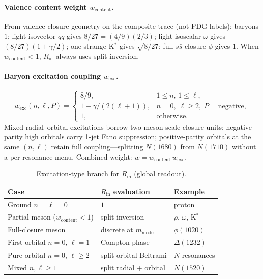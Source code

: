 \documentclass[11pt]{amsart}
\begin{document}
\paragraph{Valence content weight $w_{\mathrm{content}}$.}
From valence closure geometry on the composite trace (not PDG labels):
baryons $1$; light isovector $q\bar q$ gives $8/27=(4/9)(2/3)$; light isoscalar
$\omega$ gives $(8/27)(1+\gamma/2)$; one-strange K$^*$ gives $\sqrt{8/27}$; full
$s\bar s$ closure $\phi$ gives $1$. When $w_{\mathrm{content}}<1$, $R_{\mathrm{in}}$
always uses split inversion.

\paragraph{Baryon excitation coupling $w_{\mathrm{exc}}$.}
\begin{equation}
  w_{\mathrm{exc}}(n,\ell,P)
  = \begin{cases}
      8/9,
        & 1\le n,\,1\le\ell, \\[4pt]
      1 - \gamma/(2(\ell+1)),
        & n=0,\;\ell\ge 2,\;P=\text{negative}, \\[4pt]
      1, & \text{otherwise}.
    \end{cases}
\end{equation}
Mixed radial--orbital excitations borrow two meson-scale closure units; negative-parity
high orbitals carry 1-jet Fano suppression; positive-parity orbitals at the same
$(n,\ell)$ retain full coupling---splitting $N(1680)$ from $N(1710)$ without a
per-resonance menu. Combined weight: $w=w_{\mathrm{content}}\,w_{\mathrm{exc}}$.

\begin{table}[ht]
  \centering
  \caption{Excitation-type branch for $R_{\mathrm{in}}$ (global readout).}
  \label{tab:rin-branch}
  \small
  \begin{tabular}{lll}
    \toprule
    Case & $R_{\mathrm{in}}$ evaluation & Example \\
    \midrule
    Ground $n=\ell=0$ & $1$ & proton \\
    Partial meson ($w_{\mathrm{content}}<1$) & split inversion & $\rho$, $\omega$, K$^*$ \\
    Full-closure meson & discrete at $m_{\mathrm{mode}}$ & $\phi(1020)$ \\
    First orbital $n=0$, $\ell=1$ & Compton phase & $\Delta(1232)$ \\
    Pure orbital $n=0$, $\ell\ge 2$ & split orbital Beltrami & $N$ resonances \\
    Mixed $n,\ell\ge 1$ & split radial + orbital & $N(1520)$ \\
    \bottomrule
  \end{tabular}
\end{table}
\end{document}
